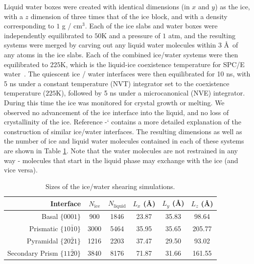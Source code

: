 \documentclass[journal = jpccck, manuscript = article]{achemso}
\newcommand*{\citen}[1]{%
  \begingroup
    \romannumeral-`\x %
    \setcitestyle{numbers}%
    \cite{#1}%
  \endgroup   
}
\begin{document}
Liquid water boxes were created with identical dimensions (in $x$ and
$y$) as the ice, with a $z$ dimension of three times that of the ice
block, and with a density corresponding to $1$ g / cm$^3$.  Each of
the ice slabs and water boxes were independently equilibrated to $50$K
and a pressure of $1$ atm, and the resulting systems were merged by
carving out any liquid water molecules within 3 \AA\ of any atoms in
the ice slabs.  Each of the combined ice/water systems were then
equilibrated to $225$K, which is the liquid-ice coexistence
temperature for SPC/E water~\cite{Bryk2002}. The quiescent ice / water
interfaces were then equilibrated for 10 ns, with 5 ns under a
constant temperature (NVT) integrator set to the coexistence
temperature ($225$K), followed by 5 ns under a microcanonical (NVE)
integrator.  During this time the ice was monitored for crystal growth
or melting. We observed no advancement of the ice interface into the
liquid, and no loss of crystallinity of the ice. Reference
\citen{Louden2013} contains a more detailed explanation of the
construction of similar ice/water interfaces. The resulting dimensions
as well as the number of ice and liquid water molecules contained in
each of these systems are shown in Table \ref{tab:method}.  Note that
the water molecules are not restrained in any way - molecules that
start in the liquid phase may exchange with the ice (and vice versa).

\begin{table}[h]
\centering
\caption{Sizes of the ice/water shearing simulations. \label{tab:method}}
\begin{tabular}{r|ccccc}
\toprule
 Interface & $N_\mathrm{ice}$ &
 $N_\mathrm{liquid}$ & $L_x$ (\AA) & $L_y$ (\AA) & $L_z$ (\AA) \\
\midrule
Basal  $\{0001\}$                 & 900 & 1846  & 23.87 & 35.83 & 98.64  \\
Prismatic  $\{10\bar{1}0\}$       & 3000 & 5464 & 35.95 & 35.65 & 205.77 \\
Pyramidal  $\{20\bar{2}1\}$       & 1216 & 2203 & 37.47 & 29.50 & 93.02  \\
Secondary Prism  $\{11\bar{2}0\}$ & 3840 & 8176 & 71.87 & 31.66 & 161.55 \\
\bottomrule
\end{tabular}
\end{table}
\end{document}
